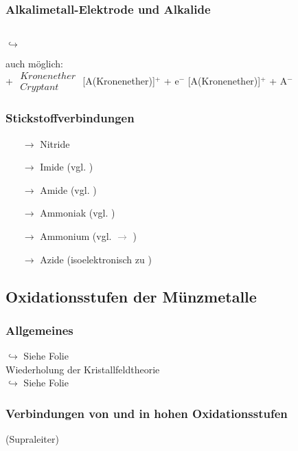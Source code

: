 \documentclass{article}
\begin{document}
\subsubsection{Alkalimetall-Elektrode und Alkalide}
\begin{center}
    \\
    $\hookrightarrow$ 
\end{center}
auch möglich:\\
 + $\begin{array}{c}Kronenether\\ Cryptant\end{array}$ \ce{->} [A(Kronenether)]$^+$ + e$^-$ \ce{->[{+A}]} [A(Kronenether)]$^+$ + A$^-$
\subsubsection{Stickstoffverbindungen}
\begin{itemize}
    \item[$\rightarrow$] Nitride 
    \item[$\rightarrow$] Imide  (vgl. )
    \item[$\rightarrow$] Amide  (vgl. )
    \item[$\rightarrow$] Ammoniak  (vgl. )
    \item[$\rightarrow$] Ammonium  (vgl.  \textcolor{gray}{$\rightarrow$ })
    \item[$\rightarrow$] Azide  (isoelektronisch zu )
\end{itemize}

\subsection{Oxidationsstufen der Münzmetalle}
\subsubsection{Allgemeines}
$\hookrightarrow$ Siehe Folie\\
Wiederholung der Kristallfeldtheorie\\
$\hookrightarrow$ Siehe Folie\\

\subsubsection{Verbindungen von  und  in hohen Oxidationsstufen}
 (Supraleiter)\\
\end{document}
